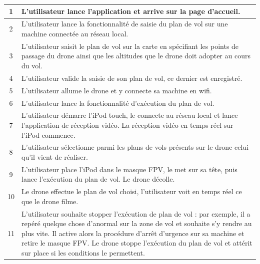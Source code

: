 \documentclass{article}
\begin{document}
	    \begin{center}
	    \renewcommand{\arraystretch}{2}
        \begin{tabularx}{15cm}{|c|X|}
            \hline
            1 & L'utilisateur lance l'application et arrive sur la page d'accueil.\\
            \hline
            2 & L'utilisateur lance la fonctionnalité de saisie du plan de vol sur une machine connectée au réseau local.\\
            \hline
            3 & L'utilisateur saisit le plan de vol sur la carte en spécifiant les points de passage du drone ainsi que les altitudes que le drone doit adopter au cours du vol. \\
            \hline
            4 & L'utilisateur valide la saisie de son plan de vol, ce dernier est enregistré. \\
            \hline
            5 & L'utilisateur allume le drone et y connecte sa machine en wifi. \\
            \hline
            6 & L'utilisateur lance la fonctionnalité d'exécution du plan de vol. \\
            \hline
            7 &  L'utilisateur démarre l'iPod touch, le connecte au réseau local et lance l'application de réception vidéo. La réception vidéo en temps réel sur l'iPod commence.\\
            \hline
            8 & L'utilisateur sélectionne parmi les plans de vols présents sur le drone celui qu'il vient de réaliser. \\
            \hline
            9 & L'utilisateur place l'iPod dans le masque FPV, le met sur sa tête, puis lance l'exécution du plan de vol. Le drone décolle. \\
            \hline
            10 & Le drone effectue le plan de vol choisi, l'utilisateur voit en temps réel ce que le drone filme. \\
            \hline
            11 & L'utilisateur souhaite stopper l'exécution de plan de vol : par exemple, il a repéré quelque chose d'anormal sur la zone de vol et souhaite s'y rendre au plus vite. Il active alors la procédure d'arrêt d'urgence sur sa machine et retire le masque FPV. Le drone stoppe l'exécution du plan de vol et attérit sur place si les conditions le permettent. \\
            \hline
        \end{tabularx}
        \end{center}
        
\end{document}

